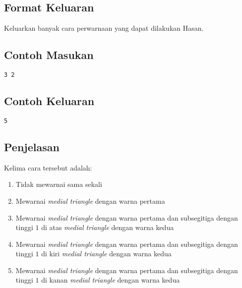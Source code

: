 \documentclass{article}
\begin{document}
\subsection*{Format Keluaran}
Keluarkan banyak cara perwarnaan yang dapat dilakukan Hasan. 

\begin{multicols}{2}
\subsection*{Contoh Masukan}
\begin{lstlisting}
3 2
\end{lstlisting}
\columnbreak

\subsection*{Contoh Keluaran}
\begin{lstlisting}
5
\end{lstlisting}
\vfill
\null
\end{multicols}

\subsection*{Penjelasan}
Kelima cara tersebut adalah:
\begin{enumerate}
    \item Tidak mewarnai sama sekali
    \item Mewarnai \textit{medial triangle} dengan warna pertama
    \item Mewarnai \textit{medial triangle} dengan warna pertama dan subsegitiga dengan tinggi $1$ di atas \textit{medial triangle} dengan warna kedua
    \item Mewarnai \textit{medial triangle} dengan warna pertama dan subsegitiga dengan tinggi $1$ di kiri \textit{medial triangle} dengan warna kedua
    \item Mewarnai \textit{medial triangle} dengan warna pertama dan subsegitiga dengan tinggi $1$ di kanan \textit{medial triangle} dengan warna kedua
\end{enumerate}
\pagebreak
\end{document}
